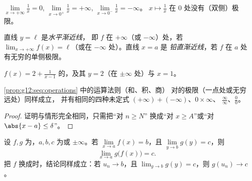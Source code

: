\begin{example}
$\lim\limits_{x\to+\infty} \frac{1}{x} = 0$,
$\lim\limits_{x\to 0^+} \frac{1}{x} = +\infty$,
$\lim\limits_{x\to 0^-} \frac{1}{x} = -\infty$。
$x \mapsto \frac1x$ 在 $0$ 处没有（双侧）极限。
\end{example}

\begin{definition}[渐近线]\label{def:g12:limcont:asymptote}
直线 $y = \ell$ 是\emph{水平渐近线}，
即 $f$ 在 $+\infty$（或 $-\infty$）处，若
$\lim_{x\to+\infty} f(x) = \ell$（或在 $-\infty$ 处）。直线 $x = a$ 是
\emph{铅直渐近线}，若 $f$ 在 $a$ 处有无穷的单侧极限。
\end{definition}

\begin{omfigure}

{\small $f(x) = 2 + \frac{1}{x-1}$ 的，及其 $y = 2$（在 $\pm\infty$ 处）与 $x = 1$。}
\end{omfigure}

\begin{proposition}[极限的运算]\label{prop:g12:limcont:operations}
\cref{prop:g12:seq:operations} 中的运算法则（和、积、商）
对的极限（一点处或无穷远处）同样成立，
并有相同的四种未定式 $(+\infty)+(-\infty)$、$0\times\infty$、
$\frac{\infty}{\infty}$、$\frac{0}{0}$。
\end{proposition}

\begin{proof}
证明与情形完全相同，只需把“对 $n \geq N$”
换成“对 $x \geq A$”或“对 $\abs{x-a} \leq \delta$”。
\end{proof}

\begin{theorem}[复合函数的极限]\label{thm:g12:limcont:composition}
设 $f, g$ 为，$a, b, c$ 为或 $\pm\infty$。若
$\lim\limits_{x \to a} f(x) = b$，且 $\lim\limits_{y \to b} g(y) = c$，则
\[
\lim_{x \to a} g\bigl(f(x)\bigr) = c .
\]
把 $f$ 换成时，结论同样成立：若
$u_n \to b$，且 $\lim_{y\to b} g(y) = c$，则 $g(u_n) \to c$。
\end{theorem}

